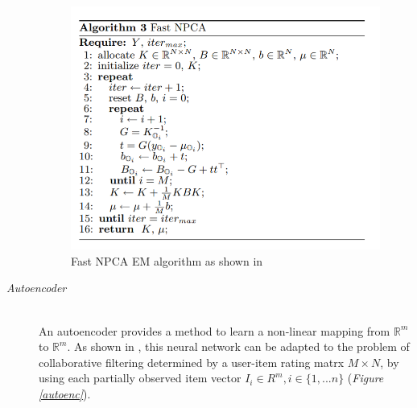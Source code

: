 \documentclass[10pt,conference,compsocconf]{IEEEtran}
\begin{document}
\begin{description}
\begin{figure}[t!]
\centering
\includegraphics[scale=0.6]{emnpca.png}
\caption{Fast NPCA EM algorithm as shown in \cite{npca}}
\label{emnpca}
\end{figure} 

\vspace{2mm}
\item[\emph{Autoencoder}] \ \\
An autoencoder provides a method to learn a non-linear mapping from $\mathbb{R}^{m}$ to $\mathbb{R}^{m}$. As shown in \cite{autorec}, this neural network can be adapted to the problem of collaborative filtering determined by a user-item rating matrx $M \times N$, by using each partially observed item vector $I_{i} \in {R}^{m} , i \in \{1,...n\}$ (\emph{Figure \ref{autoenc}}).


\end{description}
\end{document}
